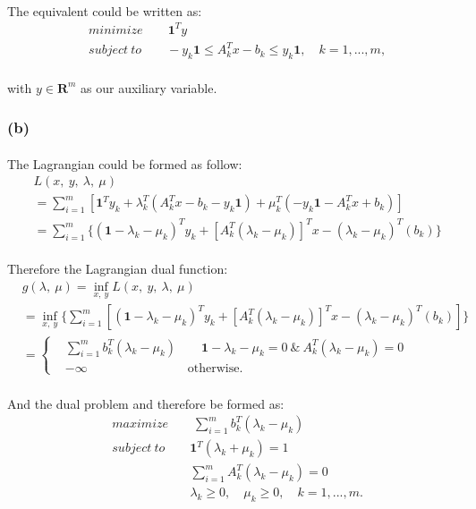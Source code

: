 \documentclass[12pt]{article}
\begin{document}
\paragraph*{}
The equivalent could be written as:
\begin{align*}
&minimize  \qquad \textbf{1}^T y\\
&subject \ to \qquad -y_k \textbf{1} \leq A_k^T x - b_k \leq y_k \textbf{1}, \quad k = 1,...,m,
\end{align*}
\paragraph*{}
with $y \in \textbf{R}^m$ as our auxiliary variable.
\subsubsection*{(b)}
\paragraph*{}
The Lagrangian could be formed as follow:
\begin{align*}
& L(x,\ y,\ \lambda,\ \mu)  \\
& = \sum_{i = 1}^{m} [\textbf{1}^T y_k + \lambda_k^T(A_k^T x -b_k -y_k \textbf{1}) + \mu_k^T(-y_k \textbf{1} -A_k^T x + b_k)]\\
& = \sum_{i = 1}^{m} \{(\textbf{1} - \lambda_k - \mu_k)^T y_k  +[A_k^T(\lambda_k - \mu_k)]^T x -(\lambda_k - \mu_k)^T (b_k)\}
\end{align*}
\paragraph*{}
Therefore the Lagrangian dual function:
\begin{align*}
& g(\lambda, \ \mu) = \inf_{x,\ y} L(x,\ y, \ \lambda,\ \mu)\\
& = \inf_{x,\ y} \{ \sum_{i = 1}^{m} [ {(\textbf{1} - \lambda_k - \mu_k)^T y_k  +[A_k^T(\lambda_k - \mu_k)]^T x -(\lambda_k - \mu_k)^T (b_k)}]\}\\
&= \begin{cases}
&\sum_{i = 1}^{m} b_k^T(\lambda_k - \mu_k) \quad \quad \textbf{1} - \lambda_k - \mu_k = 0 \ \& \  A_k^T(\lambda_k - \mu_k) = 0\\
&-\infty  \qquad \qquad \qquad \qquad \text{otherwise}.
\end{cases}
\end{align*}
\paragraph*{}
And the dual problem and therefore be formed as: 
%
\begin{align*}
&maximize \qquad \sum_{i = 1}^{m} b_k^T(\lambda_k - \mu_k)\\
&subject \ to \qquad \textbf{1}^T ( \lambda_k + \mu_k)= 1\\
& \qquad \qquad \qquad  \ \sum_{i = 1}^{m} A_k^T(\lambda_k - \mu_k) = 0\\
& \qquad \qquad \qquad  \ \lambda_k \geq 0, \quad \mu_k \geq 0, \quad k = 1,...,m.\\
\end{align*}
\vspace{-45pt}
\end{document}
